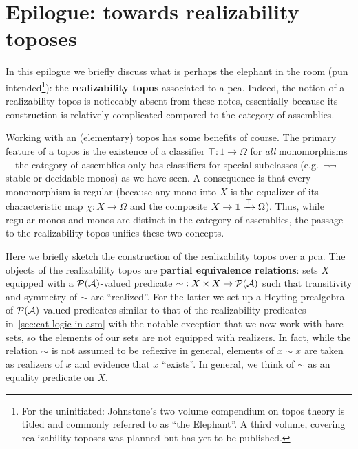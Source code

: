 \chapter{Epilogue: towards realizability toposes}\label{chap:topos}

In this epilogue we briefly discuss what is perhaps the elephant in the room (pun
intended\footnote{For the uninitiated: Johnstone's two volume compendium on
  topos theory is titled  and commonly referred to as ``the
  Elephant''. A third volume, covering realizability toposes was planned but has
  yet to be published.}): the \textbf{realizability topos} associated to a pca.
%
Indeed, the notion of a realizability topos is noticeably absent from these
notes, essentially because its construction is relatively complicated compared
to the category of assemblies.

Working with an (elementary) topos has some benefits of course. The primary
feature of a topos is the existence of a classifier
\(\top \colon 1 \to \Omega\) for \emph{all} monomorphisms---the category of
assemblies only has classifiers for special subclasses (e.g.\
\(\lnot\lnot\)-stable or decidable monos) as we have seen.
%
A consequence is that every monomorphism is regular (because any mono into \(X\)
is the equalizer of its characteristic map \(\chi \colon X \to \Omega\) and the
composite \(X \to \mathbf 1 \xrightarrow{\top} \Omega\)).
%
Thus, while regular monos and monos are distinct in the category of assemblies,
the passage to the realizability topos unifies these two concepts.

Here we briefly sketch the construction of the realizability topos over a pca.
The objects of the realizability topos are \textbf{partial equivalence
  relations}: sets \(X\) equipped with a \(\mathcal P(\mathcal A)\)-valued predicate
\({\sim} : X \times X \to \mathcal P(\mathcal A)\) such that transitivity and symmetry
of \(\sim\) are ``realized''.
%
For the latter we set up a Heyting prealgebra of \(\mathcal P(\mathcal A)\)-valued
predicates similar to that of the realizability predicates
in~\cref{sec:cat-logic-in-asm} with the notable exception that we now work with
bare sets, so the elements of our sets are not equipped with realizers.
%
In fact, while the relation \(\sim\) is not assumed to be reflexive in
general, elements of \(x \sim x\) are taken as realizers of \(x\) and
evidence that \(x\) ``exists''.
%
In general, we think of \({\sim}\) as an equality predicate on \(X\).

